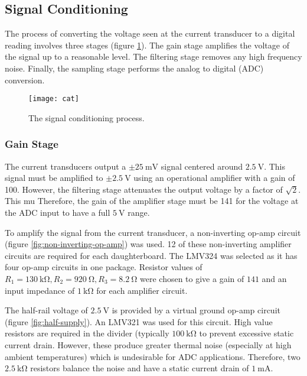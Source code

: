 \subsection{Signal Conditioning}

The process of converting the voltage seen at the current transducer to a digital reading involves three stages (figure \ref{fig:conditioning}).
The gain stage amplifies the voltage of the signal up to a reasonable level.
The filtering stage removes any high frequency noise.
Finally, the sampling stage performs the analog to digital (ADC) conversion.
\begin{figure}[H]
	\centering
	\texttt{[image: cat]}
	\caption{The signal conditioning process.}
	\label{fig:conditioning}
\end{figure}

\subsubsection{Gain Stage}

The current transducers output a $\pm \SI{25}{\milli\volt}$ signal centered around $\SI{2.5}{\volt}$.
This signal must be amplified to $\pm \SI{2.5}{\volt}$ using an operational amplifier with a gain of 100.
However, the filtering stage attenuates the output voltage by a factor of $\sqrt{2}$.
This mu
Therefore, the gain of the amplifier stage must be 141 for the voltage at the ADC input to have a full $\SI{5}{\volt}$ range.

To amplify the signal from the current transducer, a non-inverting op-amp circuit (figure \ref{fig:non-inverting-op-amp}) was used.
12 of these non-inverting amplifier circuits are required for each daughterboard.
The LMV324 was selected as it has four op-amp circuits in one package.
Resistor values of $R_1 = \SI{130}{\kilo\ohm}, R_2 = \SI{920}{\ohm}, R_3 = \SI{8.2}{\ohm}$ were chosen to give a gain of $141$ and an input impedance of $\SI{1}{\kilo\ohm}$ for each amplifier circuit.

The half-rail voltage of $\SI{2.5}{\volt}$ is provided by a virtual ground op-amp circuit (figure \ref{fig:half-supply}).
An LMV321 was used for this circuit.
High value resistors are required in the divider (typically $\SI{100}{\kilo\ohm}$ to prevent excessive static current drain.
However, these produce greater thermal noise (especially at high ambient temperatures) which is undesirable for ADC applications.
Therefore, two $\SI{2.5}{\kilo\ohm}$ resistors balance the noise and have a static current drain of $\SI{1}{\milli\ampere}$.

